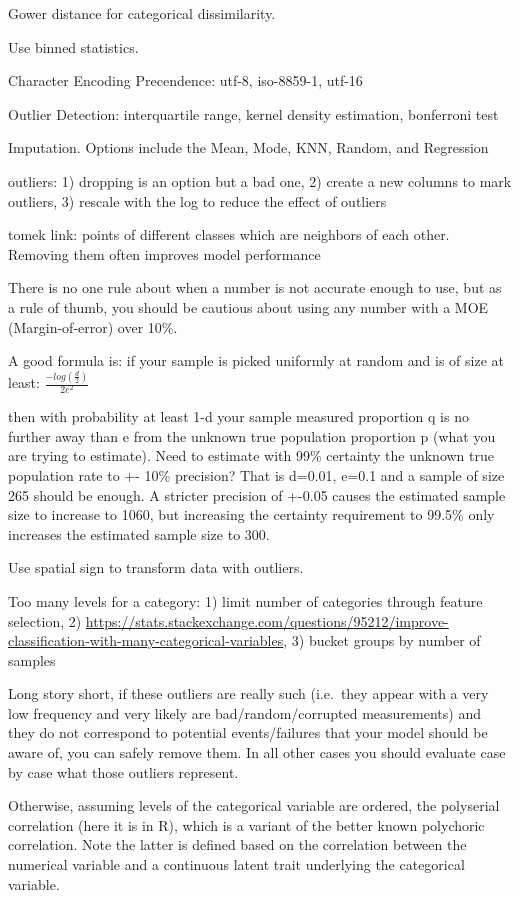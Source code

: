 \documentclass[]{book}
\begin{document}
Gower distance for categorical dissimilarity.

Use binned statistics.

Character Encoding Precendence: utf-8, iso-8859-1, utf-16

Outlier Detection: interquartile range, kernel density estimation, bonferroni test

Imputation. Options include the Mean, Mode, KNN, Random, and Regression

outliers: 1) dropping is an option but a bad one, 2) create a new columns to mark outliers, 3) rescale with the log to reduce the effect of outliers

tomek link: points of different classes which are neighbors of each other. Removing them often improves model performance

There is no one rule about when a number is not accurate enough to use, but as a rule of thumb, you should be cautious about using any number with a MOE (Margin-of-error) over 10\%.

A good formula is: if your sample is picked uniformly at random and is of size at least: \(\frac{-log(\frac{d}{2})}{2e^2}\)

then with probability at least 1-d your sample measured proportion q is no further away than e from the unknown true population proportion p (what you are trying to estimate). Need to estimate with 99\% certainty the unknown true population rate to +- 10\% precision? That is d=0.01, e=0.1 and a sample of size 265 should be enough. A stricter precision of +-0.05 causes the estimated sample size to increase to 1060, but increasing the certainty requirement to 99.5\% only increases the estimated sample size to 300.

Use spatial sign to transform data with outliers.

Too many levels for a category: 1) limit number of categories through feature selection, 2) \url{https://stats.stackexchange.com/questions/95212/improve-classification-with-many-categorical-variables}, 3) bucket groups by number of samples

Long story short, if these outliers are really such (i.e.~they appear with a very low frequency and very likely are bad/random/corrupted measurements) and they do not correspond to potential events/failures that your model should be aware of, you can safely remove them. In all other cases you should evaluate case by case what those outliers represent.

Otherwise, assuming levels of the categorical variable are ordered, the polyserial correlation (here it is in R), which is a variant of the better known polychoric correlation. Note the latter is defined based on the correlation between the numerical variable and a continuous latent trait underlying the categorical variable.
\end{document}
